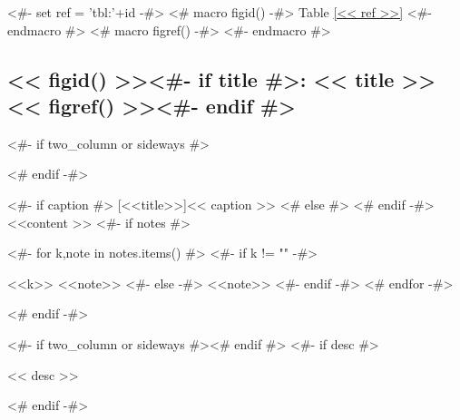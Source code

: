 <#- set ref = 'tbl:'+id -#>
<# macro figid() -#>
Table \ref{<< ref >>}
<#- endmacro #>
<# macro figref() -#>
\color{light-gray}
<#- endmacro #>

\begin{samepage}
  \subsection[<< figid() >><#- if title #>: \textit{<< title >>}<#- endif #>~~\small{<< figref() >>}]%
  {<< figid() >><#- if title #>: \GothamLight\small{<< title >>} \hfill << figref() >><#- endif #>}
\nopagebreak
<#- if two_column or sideways #>
\begin{adjustbox}{width=\textwidth,center}
<# endif -#>
\begin{threeparttable}
  <#- if caption #>
  [<<title>>]{<< caption >>}
  <# else #>
  <# endif -#>\label{<< ref >>}
  <<content >>
  <#- if notes #>
  \begin{tablenotes}
    <#- for k,note in notes.items() #>
    <#- if k != "" -#>
    \item [<<k>>] <<note>>
    <#- else -#>
    <<note>>
    <#- endif -#>
    <# endfor -#>
  \end{tablenotes}
  <# endif -#>
\end{threeparttable}
<#- if two_column or sideways #>\end{adjustbox}<# endif #>
<#- if desc #>
\nopagebreak
\begin{figinfo}<< desc >>\end{figinfo}
<# endif -#>
\end{samepage}
\vspace{20pt}

